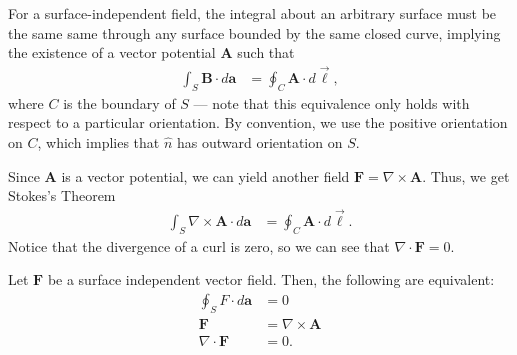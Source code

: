 \documentclass[10pt]{mypackage}
\begin{document}
For a surface-independent field, the integral about an arbitrary surface must be the same same through any surface bounded by the same closed curve, implying the existence of a vector potential $\mathbf{A}$ such that
\begin{align*}
  \int_{S}^{} \mathbf{B}\cdot d\mathbf{a} &= \oint_{C}\mathbf{A}\cdot d\vec{\ell},
\end{align*}
where $C$ is the boundary of $S$ --- note that this equivalence only holds with respect to a particular orientation. By convention, we use the positive orientation on $C$, which implies that $\widehat{n}$ has outward orientation on $S$.\newline

Since $\mathbf{A}$ is a vector potential, we can yield another field $\mathbf{F} = \nabla \times \mathbf{A}$. Thus, we get Stokes's Theorem
\begin{align*}
  \int_{S}^{} \nabla \times \mathbf{A}\cdot d\mathbf{a} &= \oint_{C}\mathbf{A}\cdot d\vec{\ell}.
\end{align*}
Notice that the divergence of a curl is zero, so we can see that $\nabla \cdot \mathbf{F} = 0$.
\begin{definition}
  Let $\mathbf{F}$ be a surface independent vector field. Then, the following are equivalent:
  \begin{align*}
    \oint_{S}F\cdot d\mathbf{a} &= 0\\
    \mathbf{F} &= \nabla \times \mathbf{A}\\
    \nabla \cdot \mathbf{F} &= 0.
  \end{align*}
\end{definition}
\end{document}
